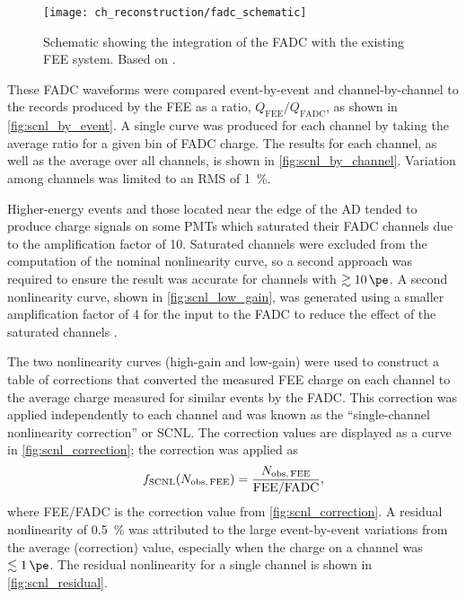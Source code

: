 \begin{figure}
    \centering
    \texttt{[image: ch\_reconstruction/fadc\_schematic]}
    \caption[FADC schematic]{
        Schematic showing the integration of the FADC
        with the existing FEE system.
        Based on \cite{scnl_poster}.
    }
    \label{fig:fadc_schematic}
\end{figure}

These FADC waveforms were compared event-by-event and channel-by-channel
to the records produced by the FEE as a ratio, $Q_\text{FEE}/Q_\text{FADC}$,
as shown in \cref{fig:scnl_by_event}.
A single curve was produced for each channel by taking the average ratio
for a given bin of FADC charge.
The results for each channel, as well as the average over all channels,
is shown in \cref{fig:scnl_by_channel}.
Variation among channels was limited to an RMS of \SI{1}{\percent}.

Higher-energy events and those located near the edge of the AD
tended to produce charge signals on some PMTs which
saturated their FADC channels due to the amplification factor of 10.
Saturated channels were excluded from the computation of the nominal nonlinearity curve,
so a second approach was required to ensure the result was accurate
for channels with $\gtrsim \SI{10}{\pe}$.
A second nonlinearity curve, shown in \cref{fig:scnl_low_gain},
was generated using a smaller amplification factor of 4 for the input to the FADC
to reduce the effect of the saturated channels \cite{scnl_slides}.

The two nonlinearity curves (high-gain and low-gain) were used
to construct a table of corrections
that converted the measured FEE charge on each channel
to the average charge measured for similar events by the FADC.
This correction was applied independently to each channel
and was known as the ``single-channel nonlinearity correction'' or SCNL.
The correction values are displayed as a curve in \cref{fig:scnl_correction};
the correction was applied as
\begin{equation}\label{eq:scnl}
    f_\text{SCNL}(N_\text{obs,\,FEE}) = \frac{N_\text{obs,\,FEE}}{\text{FEE/FADC}},
\end{equation}
where FEE/FADC is the correction value from \cref{fig:scnl_correction}.
A residual nonlinearity of \SI{0.5}{\percent}
was attributed to the large event-by-event variations
from the average (correction) value,
especially when the charge on a channel was $\lesssim\SI{1}{\pe}$.
The residual nonlinearity for a single channel is shown in \cref{fig:scnl_residual}.

